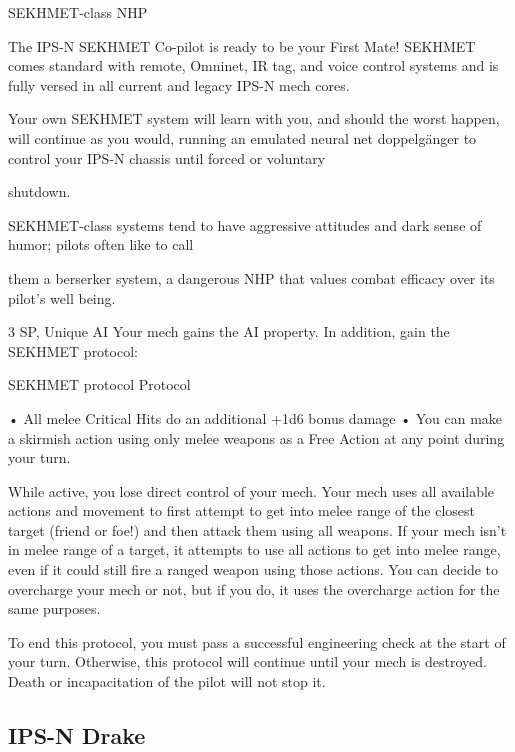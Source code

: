 SEKHMET-class NHP  

The IPS-N SEKHMET Co-pilot is ready to be your First Mate! SEKHMET comes standard with remote,  
Omninet, IR tag, and voice control systems and is fully versed in all current and legacy IPS-N mech cores.  

Your own SEKHMET system will learn with you, and should the worst happen, will continue as you would,  
running an emulated neural net doppelgänger to control your IPS-N chassis until forced or voluntary  

shutdown.   

SEKHMET-class systems tend to have aggressive attitudes and dark sense of humor; pilots often like to call  

them a berserker system, a dangerous NHP that values combat efficacy over its pilot’s well being.  

3 SP, Unique  
AI  
Your mech gains the AI property. In addition, gain the SEKHMET protocol:
 

SEKHMET protocol  
Protocol
 
        • All melee Critical Hits do an additional +1d6 bonus damage  
        •  You can make a skirmish action using only melee weapons as a Free Action at any point  
          during your turn.
 

                                                                                                                  


While active, you lose direct control of your mech. Your mech uses all available actions and  
movement to first attempt to get into melee range of the closest target (friend or foe!) and then  
attack them using all weapons. If your mech isn’t in melee range of a target, it attempts to use all  
actions to get into melee range, even if it could still fire a ranged weapon using those actions.  
You can decide to overcharge your mech or not, but if you do, it uses the overcharge action for  
the same purposes.
 

To end this protocol, you must pass a successful engineering check at the start of your turn.  
Otherwise, this protocol will continue until your mech is destroyed. Death or incapacitation of the  
pilot will not stop it.
 

                                                                                                                       
\subsection{IPS-N Drake}

